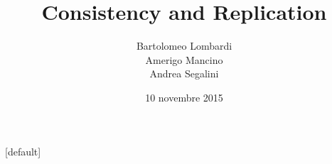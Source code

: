 \documentclass[10pt]{beamer}
\title{Consistency and Replication}
\author{Bartolomeo Lombardi \\ Amerigo Mancino \\ Andrea Segalini}
\date{10 novembre 2015}
\theoremstyle{definition}
\begin{document}
{
\makeatletter
    [default]
    \def\beamer@entrycode{\vspace*{-\headheight}}
\makeatother
\begin{frame}
	\maketitle
\end{frame}
}








\end{document}
